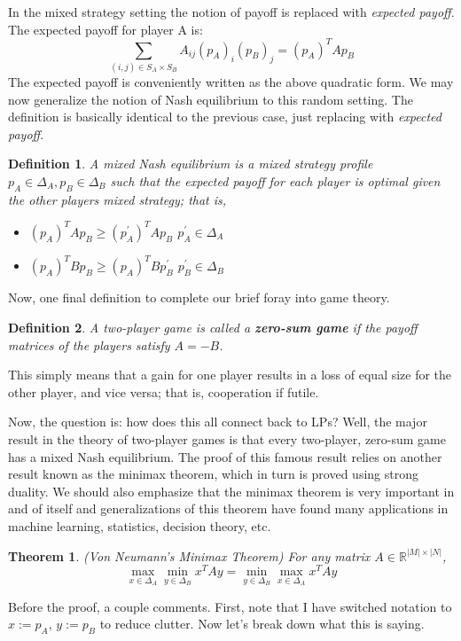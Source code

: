 \documentclass[12pt]{article}
\newcommand*{\abs}[1]{\left\lvert#1\right\rvert}
\newcommand{\R}{\mathcal{R}}
\def\R{\mathbb{R}}
\newtheorem{definition}{Definition}
\newtheorem{thm}{Theorem}
\begin{document}
In the mixed strategy setting the notion of payoff is replaced with \textit{expected payoff}. The expected payoff for 
player A is: 
\[\sum_{(i, j) \in S_A \times S_B} A_{ij} (p_A)_i (p_B)_j = (p_A)^T A p_B\]
The expected payoff is conveniently written as the above quadratic form. We may now generalize the notion of Nash equilibrium to this random setting. The 
definition is basically identical to the previous case, just replacing  with \textit{expected payoff}. 
\begin{definition}
A mixed Nash equilibrium is a mixed strategy profile $p_A \in \Delta_A, p_B \in \Delta_B$ such that the expected payoff for each player is optimal given the other 
players mixed strategy; that is, 
\begin{itemize}
\item $(p_A)^T A p_B \geq (p^\prime_A)^T A p_B$  $p^\prime_A \in \Delta_A$
\item $(p_A)^T B p_B \geq (p_A)^T B p^\prime_B$  $p^\prime_B \in \Delta_B$
\end{itemize} 
\end{definition}

Now, one final definition to complete our brief foray into game theory. 
\begin{definition}
A two-player game is called a \textbf{zero-sum game} if the payoff matrices of the players satisfy $A = -B$. 
\end{definition}
This simply means that a gain for one player results in a loss of equal size for the other player, and vice versa; that is, cooperation if futile. 

Now, the question is: how does this all connect back to LPs? Well, the major result in the theory of two-player games is that every two-player, zero-sum
game has a mixed Nash equilibrium. The proof of this famous result relies on another result known as the minimax theorem, which in turn is proved using
strong duality. We should also emphasize that the minimax theorem is very important in and of itself and generalizations of this theorem have found 
many applications in machine learning, statistics, decision theory, etc. 

\begin{thm}
(Von Neumann's Minimax Theorem) For any matrix $A \in \R^{\abs{M} \times \abs{N}}$, 
\[ \max_{x \in \Delta_A} \min_{y \in \Delta_B} x^T A y = \min_{y \in \Delta_B} \max_{x \in \Delta_A} x^T A y \]
\end{thm}
Before the proof, a couple comments. First, note that I have switched notation to $x := p_A$, $y := p_B$ to reduce clutter. Now let's break down what this is saying.
\end{document}
